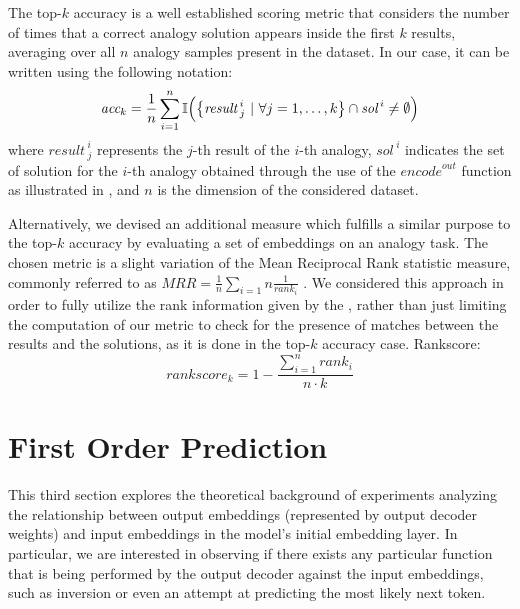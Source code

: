 The top-$k$ accuracy is a well established scoring metric that considers the number of times that a correct analogy solution appears inside the first $k$ results, averaging over all $n$ analogy samples present in the dataset.
In our case, it can be written using the following notation:
\begin{equation}
    \label{eq:method_embeddings_topk-accuracy}
    \textit{acc}_k = \frac{1}{n} \sum_{i=1}^{n} \mathbb{I}\Bigl( {\left\{ {\textit{result}\,}^i_j \ |\ \forall j = 1,\ldots,k \right\}} \cap {\textit{sol}\,}^i \neq \emptyset \Bigr)
\end{equation}
where ${\textit{result}\,}^i_j$ represents the $j$-th result of the $i$-th analogy, ${\textit{sol}\,}^i$ indicates the set of solution for the $i$-th analogy obtained through the use of the ${\textit{encode}}^{out}$ function as illustrated in , and $n$ is the dimension of the considered dataset.

Alternatively, we devised an additional measure which fulfills a similar purpose to the top-$k$ accuracy by evaluating a set of embeddings on an analogy task.
The chosen metric is a slight variation of the Mean Reciprocal Rank statistic measure, commonly referred to as $MRR = \frac{1}{n}\sum_{i=1}{n}{\frac{1}{rank_i}}$ .
We considered this approach in order to fully utilize the rank information given by the , rather than just limiting the computation of our metric to check for the presence of matches between the results and the solutions, as it is done in the top-$k$ accuracy case.
Rankscore:
\begin{equation}
    \label{eq:method_embeddings_rankscore}
    \textit{rankscore}_k = 1 - \frac{\sum_{i=1}^{n}{rank_i}}{n \cdot k}
\end{equation}


\section{First Order Prediction}\label{sec:method_fom}

This third section explores the theoretical background of experiments analyzing the relationship between output embeddings (represented by output decoder weights) and input embeddings in the model's initial embedding layer.
In particular, we are interested in observing if there exists any particular function that is being performed by the output decoder against the input embeddings, such as inversion or even an attempt at predicting the most likely next token.

